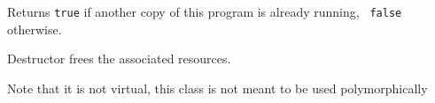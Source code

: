 \label{wxsingleinstancecheckerisanotherrunning}


Returns {\tt true} if another copy of this program is already running, {\tt
false} otherwise.

\label{wxsingleinstancecheckerdtor}


Destructor frees the associated resources.

Note that it is not virtual, this class is not meant to be used polymorphically

